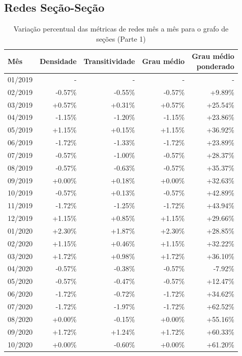 \subsection{Redes Seção-Seção}
\label{section:alteracoes-topologicas:secao}

\begin{table}[htb]
\centering
\caption{Variação percentual das métricas de redes mês a mês para o grafo de seções (Parte 1)}
\label{tab:metricas-redes-pandemia:grafo-mensal-por-secao1}
\begin{tabular}{l|rrrr}
\toprule
Mês & Densidade & Transitividade & Grau médio & \shortstack{Grau médio\\ponderado} \\
\midrule
01/2019 &  - &  - &  - &  - \\
02/2019 & -0.57\% & -0.55\% & -0.57\% &  +9.89\%\\
03/2019 & +0.57\% & +0.31\% & +0.57\% & +25.54\%\\
04/2019 & -1.15\% & -1.20\% & -1.15\% & +23.86\%\\
05/2019 & +1.15\% & +0.15\% & +1.15\% & +36.92\%\\
06/2019 & -1.72\% & -1.33\% & -1.72\% & +23.89\%\\
07/2019 & -0.57\% & -1.00\% & -0.57\% & +28.37\%\\
08/2019 & -0.57\% & -0.63\% & -0.57\% & +35.37\%\\
09/2019 & +0.00\% & +0.18\% & +0.00\% & +32.63\%\\
10/2019 & -0.57\% & +0.13\% & -0.57\% & +42.89\%\\
11/2019 & -1.72\% & -1.25\% & -1.72\% & +43.94\%\\
12/2019 & +1.15\% & +0.85\% & +1.15\% & +29.66\%\\
01/2020 & +2.30\% & +1.87\% & +2.30\% & +28.85\%\\
02/2020 & +1.15\% & +0.46\% & +1.15\% & +32.22\%\\
03/2020 & +1.72\% & +0.98\% & +1.72\% & +36.10\%\\
04/2020 & -0.57\% & -0.38\% & -0.57\% &  -7.92\%\\
05/2020 & -0.57\% & -0.47\% & -0.57\% & +12.47\%\\
06/2020 & -1.72\% & -0.72\% & -1.72\% & +34.62\%\\
07/2020 & -1.72\% & -1.97\% & -1.72\% & +62.52\%\\
08/2020 & +0.00\% & -0.15\% & +0.00\% & +55.16\%\\
09/2020 & +1.72\% & +1.24\% & +1.72\% & +60.33\%\\
10/2020 & +0.00\% & -0.60\% & +0.00\% & +61.20\%\\
\bottomrule
\end{tabular}
\fdadospesquisa
\end{table}

